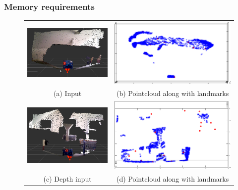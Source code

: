 \documentclass[twoside,hidelinks]{article}
\begin{document}
\subsubsection{Memory requirements}



\begin{figure}
\begin{tabular}{cc}
\includegraphics[width=60mm]{box/input1} & 
  \includegraphics[width=85mm]{box/clusters1} \\
(a) Input  & (b) Pointcloud along with landmarks\\[6pt]
	\includegraphics[width=60mm]{box/input2} & 
  \includegraphics[width=85mm]{box/clusters2} \\
(c) Depth input & (d) Pointcloud along with landmarks \\[6pt]

\end{tabular}
\end{figure}
\end{document}
